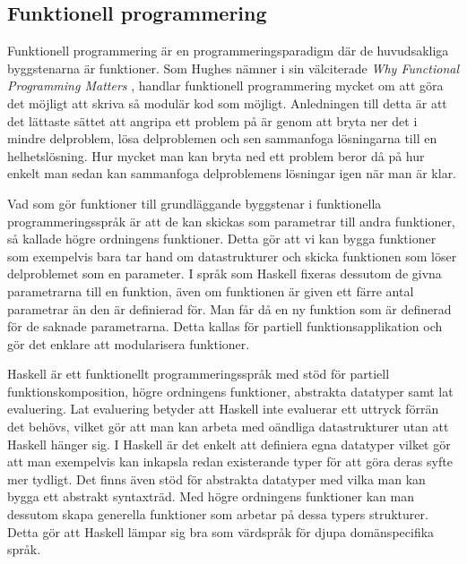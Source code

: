 \documentclass[]{article}
\begin{document}
\subsection{Funktionell programmering}
Funktionell programmering är en programmeringsparadigm där de
huvudsakliga byggstenarna är funktioner. Som Hughes nämner i sin
välciterade \textit{Why Functional Programming Matters}
\cite{hughes1989functional}, handlar funktionell programmering mycket
om att göra det möjligt att skriva så modulär kod som möjligt.
Anledningen till detta är att det lättaste sättet att angripa ett
problem på är genom att bryta ner det i mindre delproblem, lösa
delproblemen och sen sammanfoga lösningarna till en helhetslösning.
Hur mycket man kan bryta ned ett problem beror då på hur enkelt man
sedan kan sammanfoga delproblemens lösningar igen när man är klar.

Vad som gör funktioner till grundläggande byggstenar i funktionella
programmeringsspråk är att de kan skickas som parametrar till andra
funktioner, så kallade högre ordningens funktioner. Detta gör att vi
kan bygga funktioner som exempelvis bara tar hand om datastrukturer
och skicka funktionen som löser delproblemet som en parameter.
I språk som Haskell fixeras dessutom de givna parametrarna till en
funktion, även om funktionen är given ett färre antal parametrar än
den är definierad för. Man får då en ny funktion som är definerad för
de saknade parametrarna. Detta kallas för partiell
funktionsapplikation och gör det enklare att modularisera funktioner.

Haskell är ett funktionellt programmeringsspråk med stöd för partiell
funktionskomposition, högre ordningens funktioner, abstrakta datatyper
samt lat evaluering. Lat evaluering betyder att Haskell inte
evaluerar ett uttryck förrän det behövs, vilket gör att man kan arbeta
med oändliga datastrukturer utan att Haskell hänger sig. I Haskell är
det enkelt att definiera egna datatyper vilket gör att man exempelvis
kan inkapsla redan existerande typer för att göra deras syfte mer
tydligt. Det finns även stöd för abstrakta datatyper med vilka man kan
bygga ett abstrakt syntaxträd. Med högre ordningens funktioner kan man
dessutom skapa generella funktioner som arbetar på dessa typers
strukturer. Detta gör att Haskell lämpar sig bra som värdspråk för
djupa domänspecifika språk.
\end{document}
